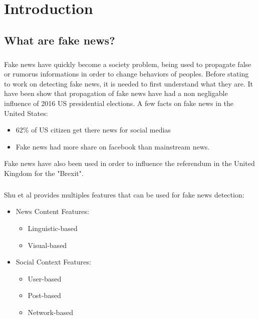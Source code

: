 
\chapter{Introduction}
\section{What are fake news?}
\paragraph{} Fake news have quickly become a society problem, being used to propagate false or rumorus informations in order to change behaviors of peoples. Before stating to work on detecting fake news, it is needed to first understand what they are. It have been show that propagation of fake news have had a non negligable influence of 2016 US presidential elections\cite{Allcott2017}. A few facts on fake news in the United States: 

\begin{itemize}
	\item $62\%$ of US citizen get there news for social medias\cite{gottfried2016news}
	\item Fake news had more share on facebook than mainstream news\cite{silverman2016teens}.
\end{itemize}

Fake news have also been used in order to influence the referendum in the United Kingdom for the "Brexit".

\paragraph{}Shu et al\cite{shu2017fake} provides multiples features that can be used for fake news detection: 

\begin{itemize}
\item News Content Features:
	\begin{itemize}
		\item Linguistic-based
		\item Visual-based
	\end{itemize}
	\item Social Context Features:
	\begin{itemize}
		\item User-based
		\item Post-based
		\item Network-based
	\end{itemize}
\end{itemize} 

